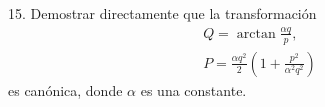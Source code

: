 15. Demostrar directamente que la transformación
$$
\begin{gathered}
Q=\arctan \frac{\alpha q}{p}, \\
P=\frac{\alpha q^2}{2}\left(1+\frac{p^2}{\alpha^2 q^2}\right)
\end{gathered}
$$
es canónica, donde $\alpha$ es una constante.